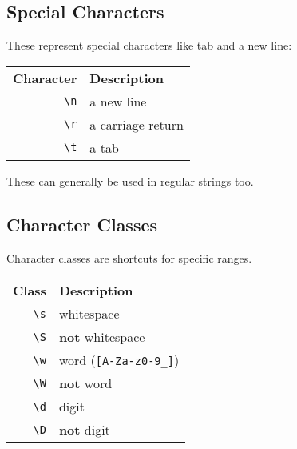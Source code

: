 \subsection{Special Characters}

These represent special characters like tab and a new line:

\begin{center}
    \begin{small}
        \begin{tabu}{r l}
            \textbf{Character}          & \textbf{Description} \\
            \texttt{\textbackslash n}          & a new line \\
            \texttt{\textbackslash r}          & a carriage return \\
            \texttt{\textbackslash t}          & a tab \\
        \end{tabu}
    \end{small}
\end{center}

These can generally be used in regular strings too.

\subsection{Character Classes}

Character classes are shortcuts for specific ranges.

\begin{center}
    \begin{small}
        \begin{tabu}{r l}
            \textbf{Class}                    & \textbf{Description} \\
            \texttt{\textbackslash s}         & whitespace \\
            \texttt{\textbackslash S}         & \textbf{not} whitespace \\
            \texttt{\textbackslash w}         & word (\texttt{[A-Za-z0-9\_]}) \\
            \texttt{\textbackslash W}         & \textbf{not} word \\
            \texttt{\textbackslash d}         & digit \\
            \texttt{\textbackslash D}         & \textbf{not} digit
        \end{tabu}
    \end{small}
\end{center}

